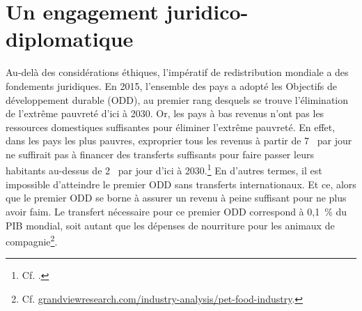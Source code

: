 \documentclass[a5paper,french,openany]{memoir}
\begin{document}
\section{Un engagement juridico-diplomatique}
Au-delà des considérations éthiques, l'impératif de redistribution mondiale a des fondements juridiques. En 2015, l'ensemble des pays a adopté les Objectifs de développement durable (ODD), au premier rang desquels se trouve l'élimination de l'extrême pauvreté d'ici à 2030. Or, les pays à bas revenus n'ont pas les ressources domestiques suffisantes pour éliminer l'extrême pauvreté. En effet, dans les pays les plus pauvres, exproprier tous les revenus à partir de 7~\textit{\texteuro} par jour ne suffirait pas à financer des transferts suffisants pour faire passer leurs habitants au-dessus de 2~\textit{\texteuro} par jour d'ici à 2030.\footnote{Cf. \citet{fabre_shortfall_2024}.} %
En d'autres termes, il est impossible d'atteindre le premier ODD sans transferts internationaux. Et ce, alors que le premier ODD se borne à assurer un revenu à peine suffisant pour ne plus avoir faim. Le transfert nécessaire pour ce premier ODD correspond à 0,1~\% du PIB mondial, soit autant que les dépenses de nourriture pour les animaux de compagnie\footnote{Cf. \href{https://www.grandviewresearch.com/industry-analysis/pet-food-industry}{grandviewresearch.com/industry-analysis/pet-food-industry}.}. %
\end{document}
